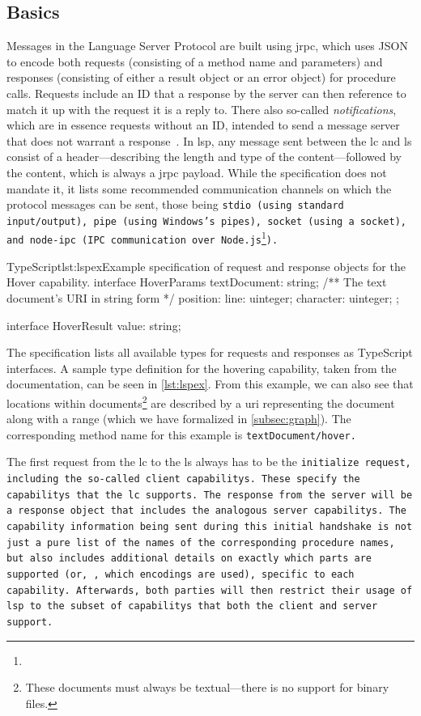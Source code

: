 \documentclass[../thesis]{subfiles}
\begin{document}
\subsection{Basics}\label{subsec:lspbasics}
Messages in the Language Server Protocol are built using \gls{jrpc}, which uses JSON to encode both requests (consisting of a method name and parameters) and responses (consisting of either a result object or an error object) for procedure calls.
Requests include an ID that a response by the server can then reference to match it up with the request it is a reply to.
There also so-called \emph{notifications}, which are in essence requests without an ID, intended to send a message server that does not warrant a response~\cite{jsonrpc,json}.
In \gls{lsp}, any message sent between the \gls{lc} and \gls{ls} consist of a header---describing the length and type of the content---followed by the content, which is always a \gls{jrpc} payload.
While the specification does not mandate it, it lists some recommended communication channels on which the protocol messages can be sent, those being \tt{stdio} (using standard input/output), \tt{pipe} (using Windows's pipes), \tt{socket} (using a socket), and \tt{node-ipc} (IPC communication over Node.js\footnote{}).

\begin{codebox}{TypeScript}{lst:lspex}{Example specification of request and response objects for the Hover {capability}.}
interface HoverParams {
  textDocument: string; /** The text document's URI in string form */
  position: { line: uinteger; character: uinteger; };
}

interface HoverResult {
  value: string;
}
\end{codebox}\label{lst:lspex}

The specification lists all available types for requests and responses as TypeScript interfaces.
A sample type definition for the hovering \gls{capability}, taken from the documentation, can be seen in \cref{lst:lspex}.
From this example, we can also see that locations within documents\footnote{
	These documents must always be textual---there is no support for binary files.
} are described by a \gls*{uri} representing the document along with a \gls{range} (which we have formalized in \cref{subsec:graph}).
The corresponding method name for this example is \tt{textDocument/hover}.

The first request from the \gls{lc} to the \gls{ls} always has to be the \tt{initialize} request, including the so-called client \glspl{capability}.
These specify the \glspl{capability} that the \gls{lc} supports.
The response from the server will be a response object that includes the analogous server \glspl{capability}.
The \gls{capability} information being sent during this initial handshake is not just a pure list of the names of the corresponding procedure names, but also includes additional details on exactly which parts are supported (or, \eg, which encodings are used), specific to each \gls{capability}.
Afterwards, both parties will then restrict their usage of \gls{lsp} to the subset of \glspl{capability} that both the client and server support.
\end{document}
